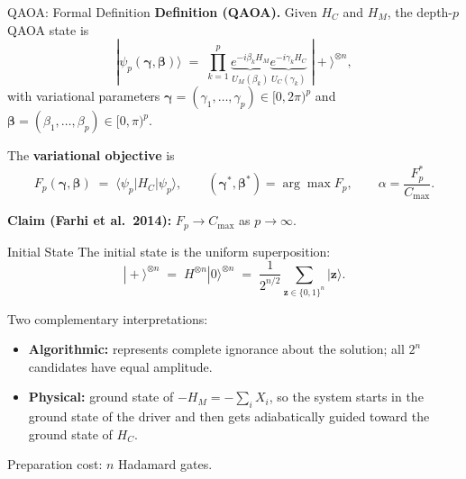 \documentclass{beamer}
\begin{document}

\begin{frame}{QAOA: Formal Definition}
\textbf{Definition (QAOA).} Given $H_C$ and $H_M$, the depth-$p$ QAOA state is
\[
\boxed{
|\psi_p(\boldsymbol{\gamma},\boldsymbol{\beta})\rangle
\;=\;
\prod_{k=1}^{p}
\underbrace{e^{-i\beta_k H_M}}_{U_M(\beta_k)}
\underbrace{e^{-i\gamma_k H_C}}_{U_C(\gamma_k)}
\;|\!+\rangle^{\otimes n},}
\]
with variational parameters
$\boldsymbol{\gamma}=(\gamma_1,\dots,\gamma_p)\in[0,2\pi)^p$ and
$\boldsymbol{\beta}=(\beta_1,\dots,\beta_p)\in[0,\pi)^p$.

\medskip

The \textbf{variational objective} is
\[
F_p(\boldsymbol{\gamma},\boldsymbol{\beta})
\;=\; \langle\psi_p|H_C|\psi_p\rangle,
\qquad
(\boldsymbol{\gamma}^*,\boldsymbol{\beta}^*)
= \arg\max F_p,
\qquad
\alpha = \frac{F_p^*}{C_{\max}}.
\]

\textbf{Claim (Farhi et al.\ 2014):} $F_p \to C_{\max}$ as $p\to\infty$.
\end{frame}


\begin{frame}{Initial State}
The initial state is the uniform superposition:
\[
|\!+\rangle^{\otimes n}
\;=\; H^{\otimes n}|0\rangle^{\otimes n}
\;=\; \frac{1}{2^{n/2}}\sum_{\mathbf{z}\in\{0,1\}^n}|\mathbf{z}\rangle.
\]

\medskip

Two complementary interpretations:
\begin{itemize}
\item \textbf{Algorithmic:} represents complete ignorance about the
  solution; all $2^n$ candidates have equal amplitude.
\item \textbf{Physical:} ground state of $-H_M = -\sum_i X_i$,
  so the system starts in the ground state of the driver and then
  gets adiabatically guided toward the ground state of $H_C$.
\end{itemize}

\medskip

Preparation cost: $n$ Hadamard gates.
\end{frame}

\end{document}
